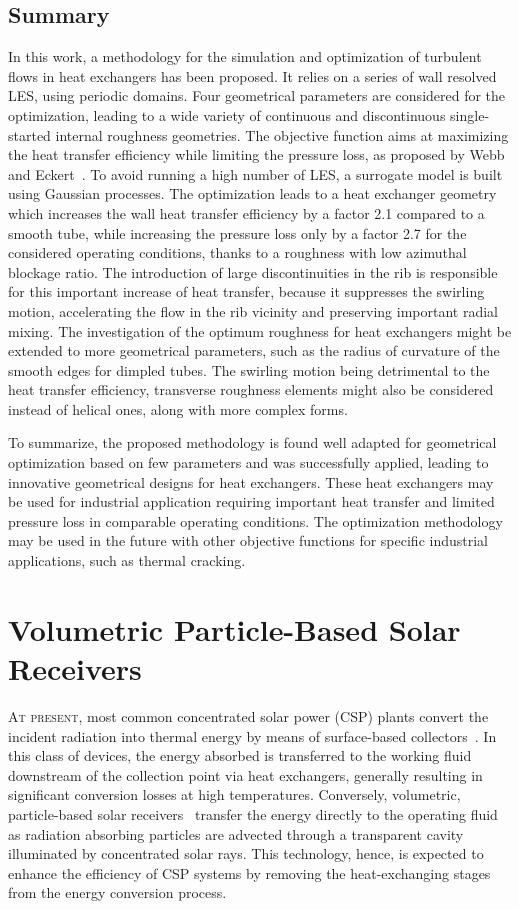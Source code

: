 \section{Summary}\label{sec:optim_ccl}
In this work, a methodology for the simulation and optimization of turbulent flows in heat exchangers has been proposed. It relies on a series of wall resolved LES, using periodic domains. Four geometrical parameters are considered for the optimization, leading to a wide variety of continuous and discontinuous single-started internal roughness geometries. The objective function aims at maximizing the heat transfer efficiency while limiting the pressure loss, as proposed by Webb and Eckert~\cite{webb1972}. To avoid running a high number of LES, a surrogate model is built using Gaussian processes. The optimization leads to a heat exchanger geometry which increases the wall heat transfer efficiency by a factor 2.1 compared to a smooth tube, while increasing the pressure loss only by a factor 2.7 for the considered operating conditions, thanks to a roughness with low azimuthal blockage ratio. The introduction of large discontinuities in the rib is responsible for this important increase of heat transfer, because it suppresses the swirling motion, accelerating the flow in the rib vicinity and preserving important radial mixing. The investigation of the optimum roughness for heat exchangers might be extended to more geometrical parameters, such as the radius of curvature of the smooth edges for dimpled tubes. The swirling motion being detrimental to the heat transfer efficiency, transverse roughness elements might also be considered instead of helical ones, along with more complex forms.

To summarize, the proposed methodology is found well adapted for geometrical optimization based on few parameters and was successfully applied, leading to innovative geometrical designs for heat exchangers. These heat exchangers may be used for industrial application requiring important heat transfer and limited pressure loss in comparable operating conditions. The optimization methodology may be used in the future with other objective functions for specific industrial applications, such as thermal cracking.

\chapter{Volumetric Particle-Based Solar Receivers}\label{chap:psaap}

\lettrine{A}{t present,} most common concentrated solar power (CSP) plants convert the incident radiation into thermal energy by means of surface-based collectors~\citep{Ho2014-A}.
In this class of devices, the energy absorbed is transferred to the working fluid downstream of the collection point via heat exchangers, generally resulting in significant conversion losses at high temperatures.
Conversely, volumetric, particle-based solar receivers~\citep{Ho2017-A} transfer the energy directly to the operating fluid as radiation absorbing particles are advected through a transparent cavity illuminated by concentrated solar rays.
This technology, hence, is expected to enhance the efficiency of CSP systems by removing the heat-exchanging stages from the energy conversion process.

